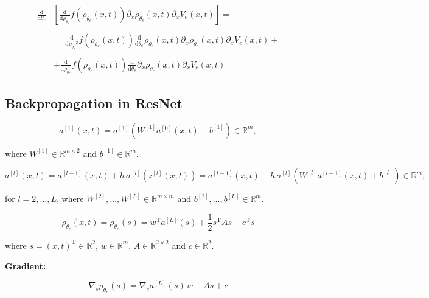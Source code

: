 \begin{align*}
    \frac{\mathrm{d}}{\mathrm{d} \theta_e} & [\frac{\mathrm{d}}{\mathrm{d} \rho_{\theta_e}} f(\rho_{\theta_e}(x, t)) \partial_x \rho_{\theta_e}(x, t) \partial_x V_e(x, t)] = \\
    \\ \quad & = \frac{\mathrm{d}}{\mathrm{d} {\rho_{\theta_e}}^2} f(\rho_{\theta_e}(x, t)) \frac{\mathrm{d}}{\mathrm{d} \theta_e} \rho_{\theta_e}(x, t) \partial_x \rho_{\theta_e}(x, t) \partial_x V_e(x, t) + \\
    \\ \quad & + \frac{\mathrm{d}}{\mathrm{d} \rho_{\theta_e}} f(\rho_{\theta_e}(x, t)) \frac{\mathrm{d}}{\mathrm{d} \theta_e} \partial_x \rho_{\theta_e}(x, t) \partial_x V_e(x, t)
\end{align*}



\subsection{Backpropagation in ResNet}

\begin{equation*}
    a^{[1]}(x,t) = \sigma^{[1]} (W^{[1]} a^{[0]}(x,t) + b^{[1]}) \in \mathbb{R}^{m}, 
\end{equation*}

where $W^{[1]} \in \mathbb{R}^{m \times 2}$ and $b^{[1]} \in \mathbb{R}^{m}$.

\begin{equation*}
    a^{[l]}(x,t) = a^{[l-1]}(x,t) + h \, \sigma^{[l]} (z^{[l]}(x,t)) = a^{[l-1]}(x,t) + h \, \sigma^{[l]} (W^{[l]} a^{[l-1]}(x,t) + b^{[l]}) \in \mathbb{R}^{m}, 
\end{equation*}

for $l = 2, \ldots, L$, where $W^{[2]}, \ldots, W^{[L]} \in \mathbb{R}^{m \times m}$ and $b^{[2]}, \ldots, b^{[L]} \in \mathbb{R}^{m}$.

\begin{equation*}
    \rho_{\theta_e}(x, t) = \rho_{\theta_e}(s) = w^{\mathrm{T}} a^{[L]}(s) + \frac{1}{2} s^{\mathrm{T}} A s + c^{\mathrm{T}} s 
\end{equation*}

where $s = (x, t)^{\mathrm{T}} \in \mathbb{R}^{2}$, $w \in \mathbb{R}^{m}$, $A \in \mathbb{R}^{2 \times 2}$ and $c \in \mathbb{R}^2$.

\textbf{Gradient:}

\begin{equation*}
    \nabla_s \rho_{\theta_e}(s) = \nabla_s a^{[L]}(s) \, w + A s + c
\end{equation*}


